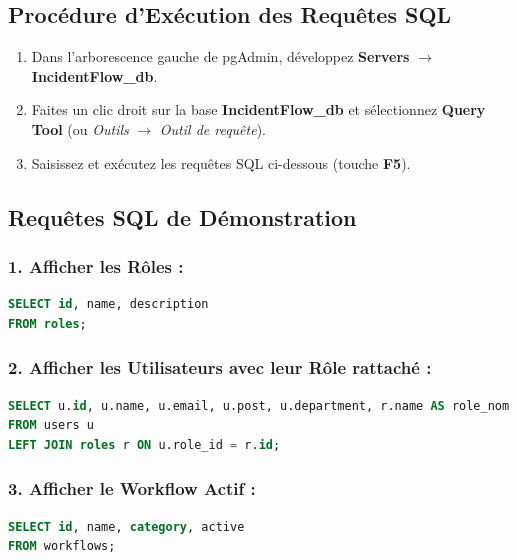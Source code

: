 \documentclass[11pt,a4paper]{article}
\begin{document}
\subsection{Procédure d'Exécution des Requêtes SQL}
\begin{enumerate}
    \item Dans l'arborescence gauche de pgAdmin, développez \textbf{Servers} $\rightarrow$ \textbf{IncidentFlow\_db}.
    \item Faites un clic droit sur la base \textbf{IncidentFlow\_db} et sélectionnez \textbf{Query Tool} (ou \textit{Outils} $\rightarrow$ \textit{Outil de requête}).
    \item Saisissez et exécutez les requêtes SQL ci-dessous (touche \textbf{F5}).
\end{enumerate}

\subsection{Requêtes SQL de Démonstration}

\subsubsection{1. Afficher les Rôles :}
\begin{lstlisting}[language=SQL, caption=Consultation des rôles en base de données]
SELECT id, name, description 
FROM roles;
\end{lstlisting}

\subsubsection{2. Afficher les Utilisateurs avec leur Rôle rattaché :}
\begin{lstlisting}[language=SQL, caption=Jointure entre Utilisateurs et Rôles]
SELECT u.id, u.name, u.email, u.post, u.department, r.name AS role_nom
FROM users u
LEFT JOIN roles r ON u.role_id = r.id;
\end{lstlisting}

\subsubsection{3. Afficher le Workflow Actif :}
\begin{lstlisting}[language=SQL, caption=Consultation de l'entité Workflow]
SELECT id, name, category, active 
FROM workflows;
\end{lstlisting}
\end{document}
